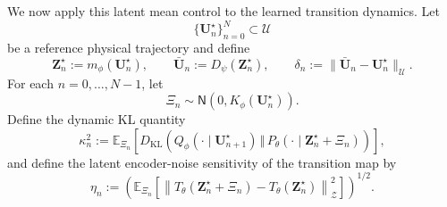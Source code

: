 \documentclass[11pt]{article}
\begin{document}
We now apply this latent mean control to the learned transition dynamics. Let
\[
    \{\mathbf U_n^\star\}_{n=0}^N\subset\mathcal U
\]
be a reference physical trajectory and define
\[
    \mathbf Z_n^\star:=m_\phi(\mathbf U_n^\star),
    \qquad
    \bar{\mathbf U}_n:=D_\psi(\mathbf Z_n^\star),
    \qquad
    \delta_n:=\|\bar{\mathbf U}_n-\mathbf U_n^\star\|_{\mathcal U}.
\]
For each $n=0,\ldots,N-1$, let
\[
    \Xi_n\sim\mathsf N(0,K_\phi(\mathbf U_n^\star)).
\]
Define the dynamic KL quantity
\[
    \kappa_n^2
    :=
    \mathbb E_{\Xi_n}
    \left[
    D_{\mathrm{KL}}
    \left(
    Q_\phi(\cdot\mid \mathbf U_{n+1}^\star)
    \,\Vert\,
    P_\theta(\cdot\mid \mathbf Z_n^\star+\Xi_n)
    \right)
    \right],
\]
and define the latent encoder-noise sensitivity of the transition map by
\[
    \eta_n
    :=\left(\mathbb E_{\Xi_n}
    \left[\left\|T_\theta(\mathbf Z_n^\star+\Xi_n)
    -T_\theta(\mathbf Z_n^\star)
    \right\|_{\mathcal Z}^2
    \right]\right)^{1/2}.
\]
\end{document}
